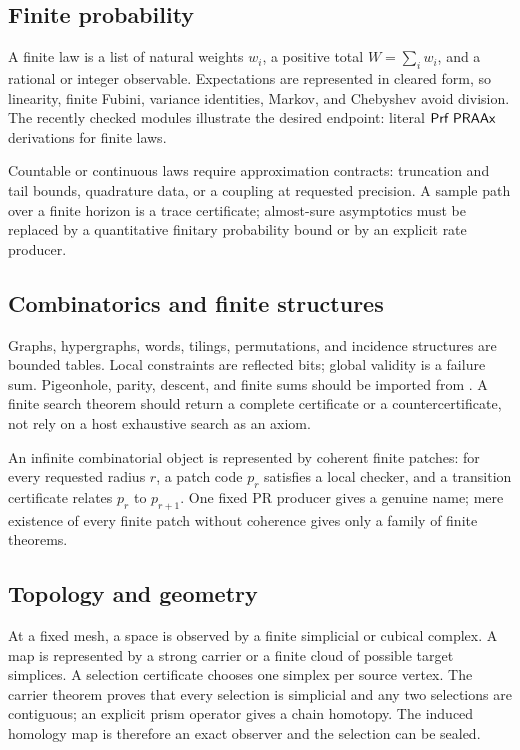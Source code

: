 \subsection{Finite probability}

A finite law is a list of natural weights \(w_i\), a positive total
\(W=\sum_i w_i\), and a rational or integer observable.  Expectations are
represented in cleared form, so linearity, finite Fubini, variance identities,
Markov, and Chebyshev avoid division.  The recently checked
 modules illustrate the desired endpoint:
literal \(\mathsf{Prf}\;\mathsf{PRAAx}\) derivations for finite laws.

Countable or continuous laws require approximation contracts: truncation and
tail bounds, quadrature data, or a coupling at requested precision.  A sample
path over a finite horizon is a trace certificate; almost-sure asymptotics
must be replaced by a quantitative finitary probability bound or by an
explicit rate producer.

\subsection{Combinatorics and finite structures}

Graphs, hypergraphs, words, tilings, permutations, and incidence structures
are bounded tables.  Local constraints are reflected bits; global validity is
a failure sum.  Pigeonhole, parity, descent, and finite sums should be imported
from .  A finite search theorem should return a complete
certificate or a countercertificate, not rely on a host exhaustive search as
an axiom.

An infinite combinatorial object is represented by coherent finite patches:
for every requested radius \(r\), a patch code \(p_r\) satisfies a local
checker, and a transition certificate relates \(p_r\) to \(p_{r+1}\).  One
fixed PR producer gives a genuine name; mere existence of every finite patch
without coherence gives only a family of finite theorems.

\subsection{Topology and geometry}

At a fixed mesh, a space is observed by a finite simplicial or cubical complex.
A map is represented by a strong carrier or a finite cloud of possible target
simplices.  A selection certificate chooses one simplex per source vertex.
The carrier theorem proves that every selection is simplicial and any two
selections are contiguous; an explicit prism operator gives a chain homotopy.
The induced homology map is therefore an exact observer and the selection can
be sealed.

